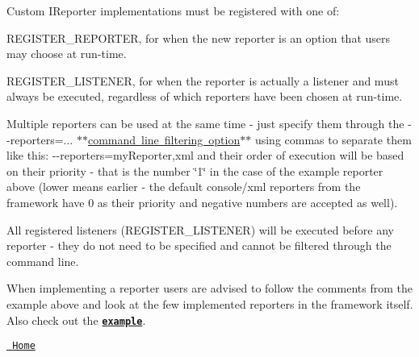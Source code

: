 \begin{DoxyCode}{0}
\DoxyCodeLine{}
\DoxyCodeLine{    \}}
\DoxyCodeLine{}
\DoxyCodeLine{}
\DoxyCodeLine{    \}}
\DoxyCodeLine{}
\DoxyCodeLine{\};}
\DoxyCodeLine{}
\DoxyCodeLine{}

\end{DoxyCode}


Custom {\ttfamily IReporter} implementations must be registered with one of\+:


\begin{DoxyItemize}
\item {\ttfamily REGISTER\+\_\+\+REPORTER}, for when the new reporter is an option that users may choose at run-\/time.
\item {\ttfamily REGISTER\+\_\+\+LISTENER}, for when the reporter is actually a listener and must always be executed, regardless of which reporters have been chosen at run-\/time.
\end{DoxyItemize}

Multiple reporters can be used at the same time -\/ just specify them through the {\ttfamily -\/-\/reporters=...} \mbox{\hyperlink{md__c___users__u_s_e_r_source_repos_bzareva_star_wars_universe_0_1_doctest_doc_markdown_commandline}{$\ast$$\ast$command line filtering option$\ast$$\ast$}} using commas to separate them like this\+: {\ttfamily -\/-\/reporters=my\+Reporter,xml} and their order of execution will be based on their priority -\/ that is the number \char`\"{}1\char`\"{} in the case of the example reporter above (lower means earlier -\/ the default console/xml reporters from the framework have 0 as their priority and negative numbers are accepted as well).

All registered listeners ({\ttfamily REGISTER\+\_\+\+LISTENER}) will be executed before any reporter -\/ they do not need to be specified and cannot be filtered through the command line.

When implementing a reporter users are advised to follow the comments from the example above and look at the few implemented reporters in the framework itself. Also check out the \href{../../examples/all_features/reporters_and_listeners.cpp}{\texttt{ {\bfseries{example}}}}.



\href{readme.md\#reference}{\texttt{ Home}}



